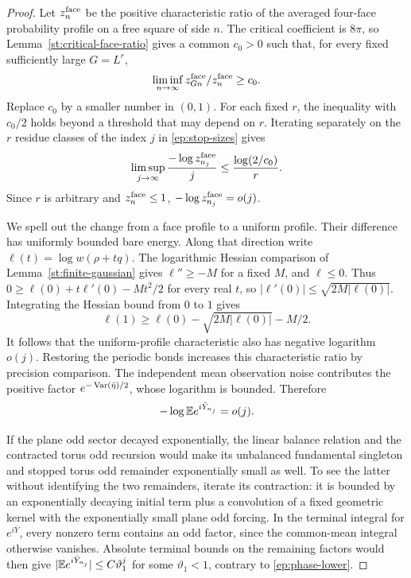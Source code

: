 \begin{proof}
Let $z_n^{\rm face}$ be the positive characteristic ratio
of the averaged four-face probability profile on a free
square of side $n$.  The critical coefficient is $8\pi$,
so Lemma~\ref{st:critical-face-ratio} gives a common
$c_0>0$ such that, for every fixed sufficiently large
$G=L^r$,
\[
 \liminf_{n\to\infty}
       z_{Gn}^{\rm face}/z_n^{\rm face}\ge c_0.
\]
Replace $c_0$ by a smaller number in $(0,1)$.
For each fixed $r$, the inequality with $c_0/2$ holds beyond
a threshold that may depend on $r$.  Iterating separately
on the $r$ residue classes of the index $j$ in
\eqref{ep:stop-sizes} gives
\[
 \limsup_{j\to\infty}
  \frac{-\log z_{n_j}^{\rm face}}j
       \le\frac{\log(2/c_0)}r .
\]
Since $r$ is arbitrary and $z_n^{\rm face}\le1$,
$-\log z_{n_j}^{\rm face}=o(j)$.

We spell out the change from a face profile to a uniform
profile.  Their difference has uniformly bounded bare
energy.  Along that direction write $\ell(t)=\log w(\rho+tq)$.
The logarithmic Hessian comparison of
Lemma~\ref{st:finite-gaussian} gives
$\ell''\ge-M$ for a fixed $M$, and $\ell\le0$.
Thus
$0\ge\ell(0)+t\ell'(0)-Mt^2/2$ for every real $t$,
so $|\ell'(0)|\le\sqrt{2M|\ell(0)|}$.
Integrating the Hessian bound from $0$ to $1$ gives
\[
 \ell(1)\ge\ell(0)-\sqrt{2M|\ell(0)|}-M/2 .
\]
It follows that the uniform-profile characteristic also
has negative logarithm $o(j)$.  Restoring the periodic bonds
increases this characteristic ratio by precision comparison.
The independent mean observation noise contributes the
positive factor $e^{-\operatorname{Var}(\bar\eta)/2}$, whose logarithm
is bounded.  Therefore
\begin{equation}\label{ep:phase-lower}
 -\log\mathbb E e^{i\bar Y_{n_j}}=o(j).
\end{equation}

If the plane odd sector decayed exponentially, the linear
balance relation and the contracted torus odd recursion
would make its unbalanced fundamental singleton and stopped
torus odd remainder exponentially small as well.  To see
the latter without identifying the two remainders, iterate
its contraction: it is bounded by an exponentially decaying
initial term plus a convolution of a fixed geometric kernel
with the exponentially small plane odd forcing.
In the terminal integral for $e^{i\bar Y}$, every nonzero
term contains an odd factor, since the common-mean integral
otherwise vanishes.  Absolute terminal bounds on the
remaining factors would then give
$|\mathbb E e^{i\bar Y_{n_j}}|\le C\vartheta_1^j$
for some $\vartheta_1<1$, contrary to
\eqref{ep:phase-lower}.
\end{proof}

